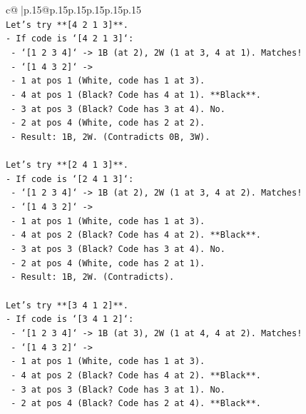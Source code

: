 \documentclass{article}
\begin{document}
{\begin{supertabular}{c@{$\;$}|p{.15\linewidth}@{}p{.15\linewidth}p{.15\linewidth}p{.15\linewidth}p{.15\linewidth}p{.15\linewidth}}
{{{\\ 
\texttt{Let's try **{[}4 2 1 3{]}**.} \\
\texttt{{-} If code is `{[}4 2 1 3{]}`:} \\
\texttt{  {-} `{[}1 2 3 4{]}` {-}> 1B (at 2), 2W (1 at 3, 4 at 1). Matches!} \\
\texttt{  {-} `{[}1 4 3 2{]}` {-}>} \\
\texttt{    {-} 1 at pos 1 (White, code has 1 at 3).} \\
\texttt{    {-} 4 at pos 1 (Black? Code has 4 at 1). **Black**.} \\
\texttt{    {-} 3 at pos 3 (Black? Code has 3 at 4). No.} \\
\texttt{    {-} 2 at pos 4 (White, code has 2 at 2).} \\
\texttt{    {-} Result: 1B, 2W. (Contradicts 0B, 3W).} \\
\\ 
\texttt{Let's try **{[}2 4 1 3{]}**.} \\
\texttt{{-} If code is `{[}2 4 1 3{]}`:} \\
\texttt{  {-} `{[}1 2 3 4{]}` {-}> 1B (at 2), 2W (1 at 3, 4 at 2). Matches!} \\
\texttt{  {-} `{[}1 4 3 2{]}` {-}>} \\
\texttt{    {-} 1 at pos 1 (White, code has 1 at 3).} \\
\texttt{    {-} 4 at pos 2 (Black? Code has 4 at 2). **Black**.} \\
\texttt{    {-} 3 at pos 3 (Black? Code has 3 at 4). No.} \\
\texttt{    {-} 2 at pos 4 (White, code has 2 at 1).} \\
\texttt{    {-} Result: 1B, 2W. (Contradicts).} \\
\\ 
\texttt{Let's try **{[}3 4 1 2{]}**.} \\
\texttt{{-} If code is `{[}3 4 1 2{]}`:} \\
\texttt{  {-} `{[}1 2 3 4{]}` {-}> 1B (at 3), 2W (1 at 4, 4 at 2). Matches!} \\
\texttt{  {-} `{[}1 4 3 2{]}` {-}>} \\
\texttt{    {-} 1 at pos 1 (White, code has 1 at 3).} \\
\texttt{    {-} 4 at pos 2 (Black? Code has 4 at 2). **Black**.} \\
\texttt{    {-} 3 at pos 3 (Black? Code has 3 at 1). No.} \\
\texttt{    {-} 2 at pos 4 (Black? Code has 2 at 4). **Black**.} \\
}}}
\end{supertabular}}
\end{document}
